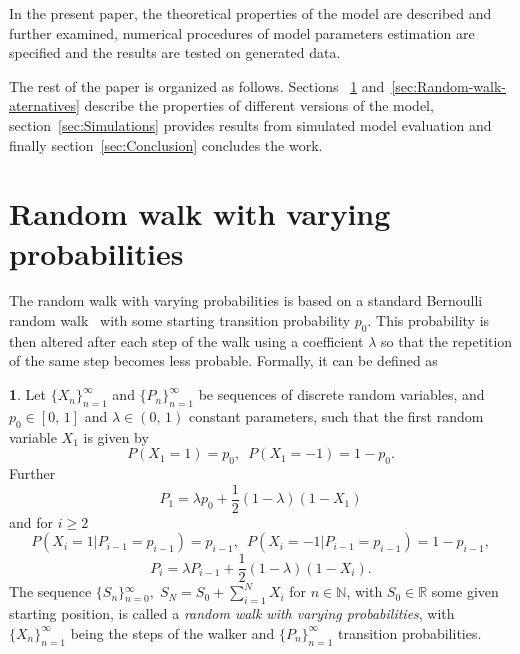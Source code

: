 \documentclass{amsart}
\theoremstyle{definition}
\newtheorem{defn}[thm]{\protect\definitionname}
\theoremstyle{plain}
\theoremstyle{plain}
\theoremstyle{plain}
\numberwithin{equation}{section}
\providecommand{\definitionname}{Definition}
\begin{document}
    In the present paper, the theoretical properties of the model are
    described and further examined, numerical procedures of model
    parameters estimation are specified and the results are tested on
    generated data.

    The rest of the paper is organized as follows.
    Sections
    ~\ref{sec:Random-walk-with} and~\ref{sec:Random-walk-aternatives}
    describe the properties of different versions of the model,
    section~\ref{sec:Simulations} provides results from simulated
    model {\color{red}evaluation} and finally section~\ref{sec:Conclusion} concludes
    the work.


    \section{Random walk with varying probabilities}\label{sec:Random-walk-with}

    The random walk with varying probabilities is based on a standard
    Bernoulli random walk~\cite{feller1957introduction} with some starting
    transition probability $p_{0}$.
    This probability is then altered
    after each step of the walk using a coefficient $\lambda$ so that
    the repetition of the same step becomes less probable.
    Formally, it
    can be defined as
    \begin{defn}
        \label{success_punished}Let ${\{X_{n}\}}_{n=1}^{\infty}$ and ${\{P_{n}\}}_{n=1}^{\infty}$
        be sequences of discrete random variables, and $p_{0}\in[0,\,1]$
        and $\lambda\in(0,\,1)$ constant parameters, such that the first
        random variable $X_{1}$ is given by
        \[
            P(X_{1}=1)=p_{0},\,\,\,
            P(X_{1}=-1)=1-p_{0}.
        \]
        Further
        \begin{equation}
            P_{1}=\lambda p_{0}+\frac{1}{2}(1-\lambda)(1-X_{1})\label{eq:P!1_def}
        \end{equation}
        and for $i\geq2$
        \[
            P(X_{i}=1|P_{i-1}=p_{i-1})=p_{i-1},\,\,\,
            P(X_{i}=-1|P_{i-1}=p_{i-1})=1-p_{i-1},
        \]
        \begin{equation}
            P_{i}=\lambda P_{i-1}+\frac{1}{2}(1-\lambda)(1-X_{i}).\label{eq:Pi_def}
        \end{equation}
        The sequence ${\{S_{n}\}}{}_{n=0}^{\infty},\;S_{N}=S_{0}+\sum_{i=1}^{N}X_{i}$
        for $n\in\mathbb{N}$, with $S_{0}\in\mathbb{R}$ some given starting
        position, is called a \emph{random walk with varying probabilities},
        with ${\{X_{n}\}}_{n=1}^{\infty}$ being the steps of the walker and
        ${\{P_{n}\}}_{n=1}^{\infty}$ transition probabilities.
    \end{defn}
\end{document}
